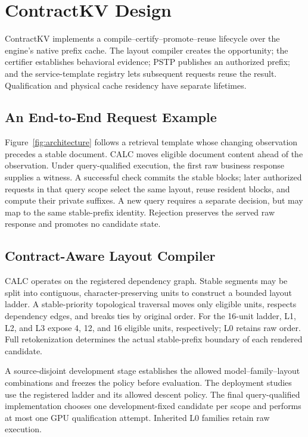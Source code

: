 \section{ContractKV Design}
\label{sec:design}

ContractKV implements a compile--certify--promote--reuse lifecycle over the engine's native prefix cache. The layout compiler creates the opportunity; the certifier establishes behavioral evidence; PSTP publishes an authorized prefix; and the service-template registry lets subsequent requests reuse the result. Qualification and physical cache residency have separate lifetimes.




\subsection{An End-to-End Request Example}
Figure~\ref{fig:architecture} follows a retrieval template whose changing observation precedes a stable document. CALC moves eligible document content ahead of the observation. Under query-qualified execution, the first raw business response supplies a witness. A successful check commits the stable blocks; later authorized requests in that query scope select the same layout, reuse resident blocks, and compute their private suffixes. A new query requires a separate decision, but may map to the same stable-prefix identity. Rejection preserves the served raw response and promotes no candidate state.

\subsection{Contract-Aware Layout Compiler}
\label{sec:calc}
CALC operates on the registered dependency graph. Stable segments may be split into contiguous, character-preserving units to construct a bounded layout ladder. A stable-priority topological traversal moves only eligible units, respects dependency edges, and breaks ties by original order. For the 16-unit ladder, L1, L2, and L3 expose 4, 12, and 16 eligible units, respectively; L0 retains raw order. Full retokenization determines the actual stable-prefix boundary of each rendered candidate.

A source-disjoint development stage establishes the allowed model--family--layout combinations and freezes the policy before evaluation. The deployment studies use the registered ladder and its allowed descent policy. The final query-qualified implementation chooses one development-fixed candidate per scope and performs at most one GPU qualification attempt. Inherited L0 families retain raw execution.

